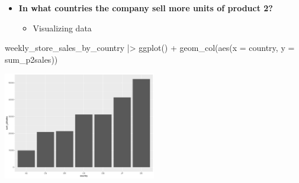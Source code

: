 \documentclass[
  ignorenonframetext,
]{beamer}
\newenvironment{Shaded}{\begin{snugshade}}{\end{snugshade}}
\newcommand{\AttributeTok}[1]{\textcolor[rgb]{0.40,0.45,0.13}{#1}}
\newcommand{\FunctionTok}[1]{\textcolor[rgb]{0.28,0.35,0.67}{#1}}
\newcommand{\NormalTok}[1]{\textcolor[rgb]{0.00,0.23,0.31}{#1}}
\newcommand{\SpecialCharTok}[1]{\textcolor[rgb]{0.37,0.37,0.37}{#1}}
\providecommand{\tightlist}{%
  \setlength{\itemsep}{0pt}\setlength{\parskip}{0pt}}\usepackage{longtable,booktabs,array}
\begin{document}
\begin{frame}[fragile]{}
\label{section-32}
\begin{itemize}
\item
  \textbf{In what countries the company sell more units of product 2?}

  \begin{itemize}
  \tightlist
  \item
    Visualizing data
  \end{itemize}
\end{itemize}

\tiny

\begin{Shaded}
\begin{Highlighting}[]
\NormalTok{weekly\_store\_sales\_by\_country }\SpecialCharTok{|\textgreater{}} \FunctionTok{ggplot}\NormalTok{() }\SpecialCharTok{+} 
  \FunctionTok{geom\_col}\NormalTok{(}\FunctionTok{aes}\NormalTok{(}\AttributeTok{x =}\NormalTok{ country, }\AttributeTok{y =}\NormalTok{ sum\_p2sales))}
\end{Highlighting}
\end{Shaded}

\begin{center}
\includegraphics[width=0.5\textwidth,height=\textheight]{003_describing_data_files/figure-beamer/unnamed-chunk-31-1.pdf}
\end{center}
\end{frame}
\end{document}
